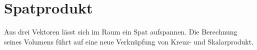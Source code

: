 \section{Spatprodukt}
\label{sec:vector_algebra_scalar_triple_product}

Aus drei Vektoren lässt sich im Raum ein Spat aufspannen. Die Berechnung seines
Volumens führt auf eine neue Verknüpfung von Kreuz- und Skalarprodukt.


\clearpage

